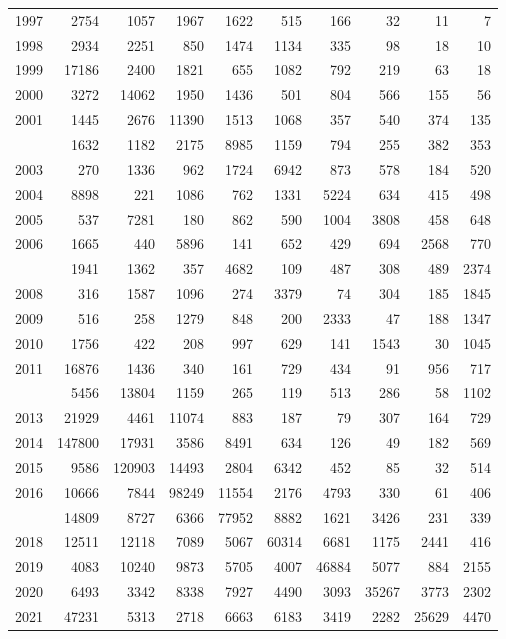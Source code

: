 \documentclass[
]{article}
\begin{document}
\begin{longtable}[t]{lrrrrrrrrr}
1997 & 2754 & 1057 & 1967 & 1622 & 515 & 166 & 32 & 11 & 7\\
1998 & 2934 & 2251 & 850 & 1474 & 1134 & 335 & 98 & 18 & 10\\
1999 & 17186 & 2400 & 1821 & 655 & 1082 & 792 & 219 & 63 & 18\\
2000 & 3272 & 14062 & 1950 & 1436 & 501 & 804 & 566 & 155 & 56\\
2001 & 1445 & 2676 & 11390 & 1513 & 1068 & 357 & 540 & 374 & 135\\
\addlinespace
2002 & 1632 & 1182 & 2175 & 8985 & 1159 & 794 & 255 & 382 & 353\\
2003 & 270 & 1336 & 962 & 1724 & 6942 & 873 & 578 & 184 & 520\\
2004 & 8898 & 221 & 1086 & 762 & 1331 & 5224 & 634 & 415 & 498\\
2005 & 537 & 7281 & 180 & 862 & 590 & 1004 & 3808 & 458 & 648\\
2006 & 1665 & 440 & 5896 & 141 & 652 & 429 & 694 & 2568 & 770\\
\addlinespace
2007 & 1941 & 1362 & 357 & 4682 & 109 & 487 & 308 & 489 & 2374\\
2008 & 316 & 1587 & 1096 & 274 & 3379 & 74 & 304 & 185 & 1845\\
2009 & 516 & 258 & 1279 & 848 & 200 & 2333 & 47 & 188 & 1347\\
2010 & 1756 & 422 & 208 & 997 & 629 & 141 & 1543 & 30 & 1045\\
2011 & 16876 & 1436 & 340 & 161 & 729 & 434 & 91 & 956 & 717\\
\addlinespace
2012 & 5456 & 13804 & 1159 & 265 & 119 & 513 & 286 & 58 & 1102\\
2013 & 21929 & 4461 & 11074 & 883 & 187 & 79 & 307 & 164 & 729\\
2014 & 147800 & 17931 & 3586 & 8491 & 634 & 126 & 49 & 182 & 569\\
2015 & 9586 & 120903 & 14493 & 2804 & 6342 & 452 & 85 & 32 & 514\\
2016 & 10666 & 7844 & 98249 & 11554 & 2176 & 4793 & 330 & 61 & 406\\
\addlinespace
2017 & 14809 & 8727 & 6366 & 77952 & 8882 & 1621 & 3426 & 231 & 339\\
2018 & 12511 & 12118 & 7089 & 5067 & 60314 & 6681 & 1175 & 2441 & 416\\
2019 & 4083 & 10240 & 9873 & 5705 & 4007 & 46884 & 5077 & 884 & 2155\\
2020 & 6493 & 3342 & 8338 & 7927 & 4490 & 3093 & 35267 & 3773 & 2302\\
2021 & 47231 & 5313 & 2718 & 6663 & 6183 & 3419 & 2282 & 25629 & 4470\\*
\end{longtable}
\end{document}
